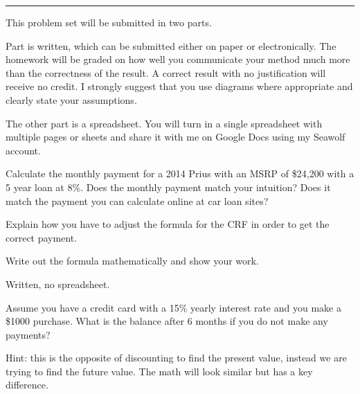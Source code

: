 \documentclass{article}
\begin{document}
\hrule
\vspace{10pt}

This problem set will be submitted in two parts.

Part is written, which can be submitted either on paper or
electronically.  The homework will be graded on how well you communicate
your method much more than the correctness of the result.  A correct
result with no justification will receive no credit.  I strongly
suggest that you use diagrams where appropriate and clearly state your
assumptions.

The other part is a spreadsheet.  You will turn in a single spreadsheet
with multiple pages or sheets and share it with me on Google Docs using
my Seawolf account.



Calculate the monthly payment for a 2014 Prius with an MSRP of \$24,200
with a 5 year loan at 8\%.  Does the monthly payment match your
intuition?  Does it match the payment you can calculate online at car
loan sites?

Explain how you have to adjust the formula for the CRF in order to get
the correct payment.

Write out the formula mathematically and show your work.

Written, no spreadsheet.



Assume you have a credit card with a 15\% yearly interest rate and you make a
\$1000 purchase.  What is the balance after 6 months if you do not make
any payments?

Hint: this is the opposite of discounting to find the present value,
instead we are trying to find the future value.  The math will look
similar but has a key difference.
\end{document}
